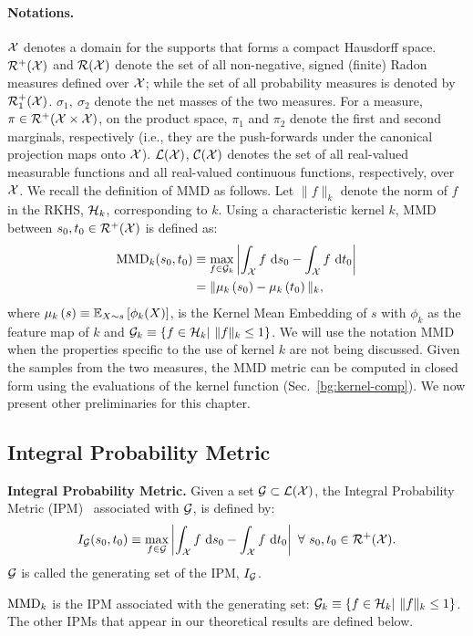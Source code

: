 \paragraph{Notations.} $\mathcal{X}$ denotes a domain for the supports that forms a compact Hausdorff space. $\mathcal{R}^+(\mathcal{X})$ and $\mathcal{R}(\mathcal{X})$ denote the set of all non-negative, signed (finite) Radon measures defined over $\mathcal{X}$; while the set of all probability measures is denoted by $\mathcal{R}^+_1(\mathcal{X})$. $\sigma_1, \ \sigma_2$ denote the net masses of the two measures. For a measure, $\pi\in\mathcal{R}^+(\mathcal{X}\times\mathcal{X})$, on the product space, $\pi_1$ and $\pi_2$ denote the first and second marginals, respectively (i.e., they are the push-forwards under the canonical projection maps onto $\mathcal{X}$). $\mathcal{L}(\mathcal{X})$, $\mathcal{C}(\mathcal{X})$ denotes the set of all real-valued measurable functions and all real-valued continuous functions, respectively, over $\mathcal{X}$.
\newline We recall the definition of MMD as follows.
Let $\|f\|_k$ denote the norm of $f$ in the RKHS, $\mathcal{H}_k$, corresponding to $k$. Using a characteristic kernel $k$, MMD between $s_0, t_0\in \mathcal{R}^+(\mathcal{X})$ is defined as:
\begin{align}\label{uot:mmd}
    \textup{MMD}_k(s_0,t_0)&\equiv  \max\limits_{f\in\mathcal{G}_k}\left|\int_{\mathcal{X}} f\ \textup{d}s_0-\int_{\mathcal{X}} f\ \textup{d}t_0\right|\nonumber\\
     &= \|\mu_k\left(s_0\right)-\mu_k\left(t_0\right)\|_k,
\end{align}
where $\mu_k\left(s\right)\equiv \mathbb{E}_{X\sim s}\left[\phi_k(X)\right]$, is the Kernel Mean Embedding of $s$ with $\phi_k$ as the feature map of $k$ and $\calG_k\equiv\left\{f\in\calH_k |\ \|f\|_k\le1\right\}$. We will use the notation MMD when the properties specific to the use of kernel $k$ are not being discussed. Given the samples from the two measures, the MMD metric can be computed in closed form using the evaluations of the kernel function (Sec.~\ref{bg:kernel-comp}).
\newline
We now present other preliminaries for this chapter.
\subsection{Integral Probability Metric}
\begin{definitionBox}
\begin{definition}{\textbf{Integral Probability Metric.}}\newline
Given a set $\mathcal{G}\subset\mathcal{L}(\mathcal{X})$, the Integral Probability Metric (IPM)~\citep{mullergenset97,Sriperumbudur09onintegral,agrawal20a} associated with $\mathcal{G}$, is defined by:
\begin{equation}\label{eqn:ipm}     I_\calG(s_0,t_0)\equiv\max\limits_{f\in\calG}\left|\int_\calX f\ \textup{d}s_0-\int_\calX f\ \textup{d}t_0\right|\ \forall\ s_0,t_0\in\calR^+(\calX).
\end{equation}
$\mathcal{G}$ is called the generating set of the IPM, $ I_{\mathcal{G}}$.
\end{definition}
\end{definitionBox}
 $\textup{MMD}_k$ is the IPM associated with the generating set: $\calG_k\equiv\left\{f\in\calH_k |\ \|f\|_k\le1\right\}$. The other IPMs that appear in our theoretical results are defined below.
